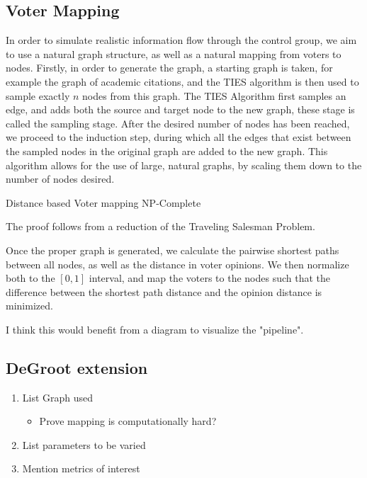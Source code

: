 \subsection{Voter Mapping}
In order to simulate realistic information flow through the control group, we aim to use a natural graph structure, as well as a natural mapping from voters to nodes. Firstly, in order to generate the graph, a starting graph is taken, for example the graph of academic citations, and the TIES \cite{ahmedNetworkSamplingStatic2013} algorithm is then used to sample exactly $n$ nodes from this graph. The TIES Algorithm first samples an edge, and adds both the source and target node to the new graph, these stage is called the sampling stage. After the desired number of nodes has been reached, we proceed to the induction step, during which all the edges that exist between the sampled nodes in the original graph are added to the new graph. This algorithm allows for the use of large, natural graphs, by scaling them down to the number of nodes desired.

\begin{theorem}{}
	Distance based Voter mapping NP-Complete
\end{theorem}

\begin{proofc}{}
	The proof follows from a reduction of the Traveling Salesman Problem. 
\end{proofc}

Once the proper graph is generated, we calculate the pairwise shortest paths between all nodes, as well as the distance in voter opinions. We then normalize both to the $[0,1]$ interval, and map the voters to the nodes such that the difference between the shortest path distance and the opinion distance is minimized.

\textcolor{Bittersweet}{I think this would benefit from a diagram to visualize the "pipeline"}.

\subsection{DeGroot extension}
\begin{enumerate}
	\item List Graph used
	      \begin{itemize}
		      \item Prove mapping is computationally hard?
	      \end{itemize}
	\item List parameters to be varied
	\item Mention metrics of interest

\end{enumerate}
